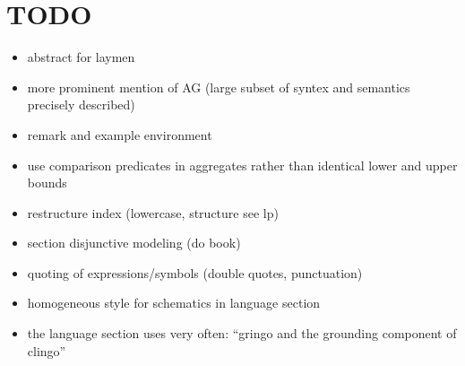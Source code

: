 \section{TODO}
\begin{itemize}
\item abstract for laymen
\item more prominent mention of AG (large subset of syntex and semantics precisely described)
\item remark and example environment
\item use comparison predicates in aggregates rather than identical lower and upper bounds
\item restructure index (lowercase, structure see lp)
\item section disjunctive modeling (do book)
\item quoting of expressions/symbols (double quotes, punctuation)
\item homogeneous style for schematics in language section
\item the language section uses very often: ``gringo and the grounding component of clingo''
  
\end{itemize}

